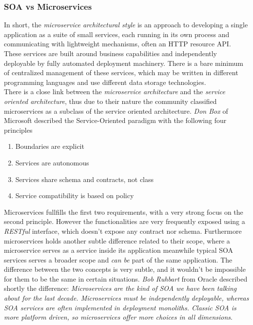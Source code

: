 \subsubsection{SOA vs Microservices}
In short, the \textit{microservice architectural style} is an approach to developing a single
application as a suite of small services, each running in its own process and communicating with
lightweight mechanisms, often an HTTP resource API. These services are built around business capabilities
and independently deployable by fully automated deployment machinery. There is
a bare minimum of centralized management of these services,
which may be written in different programming languages and use different data storage technologies.\cite{microarch}\\
There is a close link between the \textit{microservice architecture} and the \textit{service oriented architecture},
thus due to their nature the community classified microservices as a subclass of the service oriented architecture.
\textit{Don Box} of Microsoft described the Service-Oriented paradigm with the following four principles\cite{msdn}

\begin{enumerate}
  \item Boundaries are explicit
  \item Services are autonomous
  \item Services share schema and contracts, not class
  \item Service compatibility is based on policy
\end{enumerate}

Microservices fullfills the first two requirements, with a very strong focus on the second principle.
However the functionalities are very frequently exposed using a \textit{RESTful} interface, which
doesn't expose any contract nor schema. Furthermore microservices holds another subtle difference related to their
scope, where a microservice serves as a service inside its application meanwhile typical SOA services
serves a broader scope and \textit{can be} part of the same application.
The difference between the two concepts is very subtle, and it wouldn't be impossible for them
to be the same in certain situations. \textit{Bob Ruhbart} from Oracle described shortly the difference:
\textit{Microservices are the kind of SOA we have been talking about for the last decade. Microservices must be independently deployable,
whereas SOA services are often implemented in deployment monoliths.
Classic SOA is more platform driven, so microservices offer more choices
in all dimensions}\cite{microsoa}.

